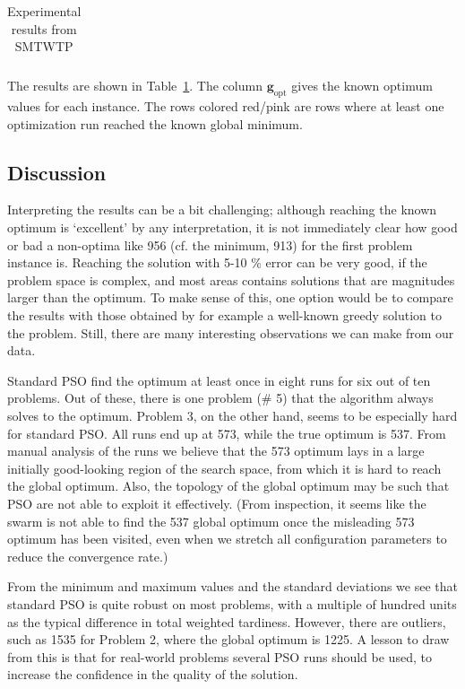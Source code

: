 \documentclass[a4paper,final,9pt]{article}
\begin{document}
\begin{table}[h!]
  \label{tab:res1}
  \begin{center}
    \begin{tabular}{|c|c|c|c|c|c|c|}
      \hline
      
    \end{tabular}
  \end{center}
  \caption{Experimental results from SMTWTP} 
\end{table}

The results are shown in Table~\ref{tab:res1}. The column
$\mathbf{g}_\text{opt}$ gives the known optimum values for each instance.  The
rows colored red/pink are rows where at least one optimization run reached the
known global minimum.

\subsection{Discussion}
Interpreting the results can be a bit challenging; although reaching the known
optimum is `excellent' by any interpretation, it is not immediately clear how
good or bad a non-optima like 956 (cf. the minimum, 913) for the first problem
instance is. Reaching the solution with 5-10 \% error can be very good, if the
problem space is complex, and most areas contains solutions that are
magnitudes larger than the optimum.  To make sense of this, one option would
be to compare the results with those obtained by for example a well-known
greedy solution to the problem. Still, there are many interesting observations
we can make from our data.

Standard PSO find the optimum at least once in eight runs for six out of ten
problems. Out of these, there is one problem (\# 5) that the algorithm always
solves to the optimum.  Problem 3, on the other hand, seems to be especially
hard for standard PSO.  All runs end up at 573, while the true optimum is 537.
From manual analysis of the runs we believe that the 573 optimum lays in a
large initially good-looking region of the search space, from which it is hard
to reach the global optimum.  Also, the topology of the global optimum may be
such that PSO are not able to exploit it effectively. (From inspection, it
seems like the swarm is not able to find the 537 global optimum once the
misleading 573 optimum has been visited, even when we stretch all
configuration parameters to reduce the convergence rate.)

From the minimum and maximum values and the standard deviations we see that
standard PSO is quite robust on most problems, with a multiple of
hundred units as the typical difference in total weighted tardiness.
However, there are outliers, such as 1535 for Problem 2, where the global
optimum is 1225. A lesson to draw from this is that for real-world problems
several PSO runs should be used, to increase the confidence in the quality of
the solution.
\end{document}
